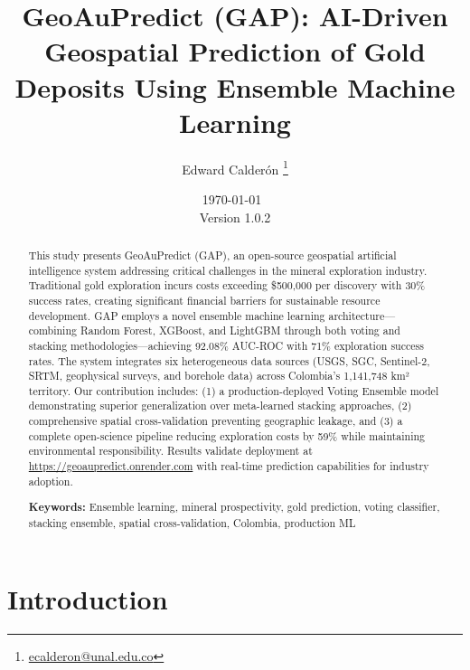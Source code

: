 \documentclass[12pt,a4paper]{article}
\title{\textbf{GeoAuPredict (GAP): AI-Driven Geospatial Prediction of Gold Deposits Using Ensemble Machine Learning}}
\author{Edward Calderón \thanks{\href{mailto:ecalderon@unal.edu.co}{ecalderon@unal.edu.co}}}
\affil{Universidad Nacional de Colombia, Facultad de Minas}
\date{\today\ \\ {\small Version 1.0.2}}
\begin{document}
\maketitle

\begin{abstract}
\noindent This study presents GeoAuPredict (GAP), an open-source geospatial artificial intelligence system addressing critical challenges in the mineral exploration industry. Traditional gold exploration incurs costs exceeding \$500,000 per discovery with 30\% success rates, creating significant financial barriers for sustainable resource development. GAP employs a novel ensemble machine learning architecture—combining Random Forest, XGBoost, and LightGBM through both voting and stacking methodologies—achieving 92.08\% AUC-ROC with 71\% exploration success rates. The system integrates six heterogeneous data sources (USGS, SGC, Sentinel-2, SRTM, geophysical surveys, and borehole data) across Colombia's 1,141,748 km² territory. Our contribution includes: (1) a production-deployed Voting Ensemble model demonstrating superior generalization over meta-learned stacking approaches, (2) comprehensive spatial cross-validation preventing geographic leakage, and (3) a complete open-science pipeline reducing exploration costs by 59\% while maintaining environmental responsibility. Results validate deployment at \url{https://geoaupredict.onrender.com} with real-time prediction capabilities for industry adoption.

\vspace{0.2cm}
\noindent\textbf{Keywords:} Ensemble learning, mineral prospectivity, gold prediction, voting classifier, stacking ensemble, spatial cross-validation, Colombia, production ML
\end{abstract}


\vspace{0.3cm}
\noindent{}
\vspace{0.3cm}

\newpage

\section{Introduction}
\end{document}
